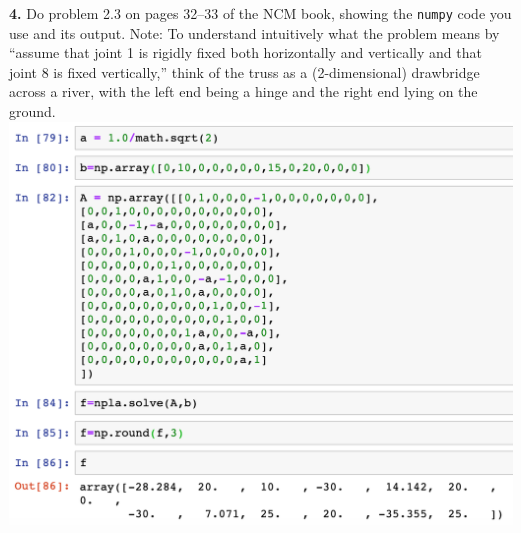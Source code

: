 \documentclass[11pt]{article}
\begin{document}
\par\bigskip
{\bf 4.} Do problem 2.3 on pages 32--33 of the NCM book, 
showing the {\tt numpy} code you use and its output. 
Note: To understand intuitively what the problem means by 
``assume that joint 1 is rigidly fixed both horizontally and vertically 
and that joint 8 is fixed vertically,'' 
think of the truss as a (2-dimensional) drawbridge across a river, 
with the left end being a hinge and the right end lying on the ground.\newline
\includegraphics[scale=0.8]{P4H3}
\newpage
\end{document}

